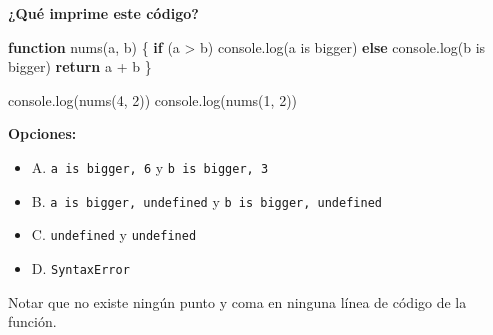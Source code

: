 \documentclass[
  letterpaper,
  DIV=11,
  numbers=noendperiod]{scrreprt}
\newenvironment{Shaded}{\begin{snugshade}}{\end{snugshade}}
\newcommand{\BuiltInTok}[1]{\textcolor[rgb]{0.00,0.23,0.31}{#1}}
\newcommand{\ControlFlowTok}[1]{\textcolor[rgb]{0.00,0.23,0.31}{\textbf{#1}}}
\newcommand{\DecValTok}[1]{\textcolor[rgb]{0.68,0.00,0.00}{#1}}
\newcommand{\FunctionTok}[1]{\textcolor[rgb]{0.28,0.35,0.67}{#1}}
\newcommand{\KeywordTok}[1]{\textcolor[rgb]{0.00,0.23,0.31}{\textbf{#1}}}
\newcommand{\NormalTok}[1]{\textcolor[rgb]{0.00,0.23,0.31}{#1}}
\newcommand{\OperatorTok}[1]{\textcolor[rgb]{0.37,0.37,0.37}{#1}}
\newcommand{\StringTok}[1]{\textcolor[rgb]{0.13,0.47,0.30}{#1}}
\providecommand{\tightlist}{%
  \setlength{\itemsep}{0pt}\setlength{\parskip}{0pt}}
\begin{document}
\textbf{¿Qué imprime este código?}

\begin{Shaded}
\begin{Highlighting}[]
\KeywordTok{function} \FunctionTok{nums}\NormalTok{(a}\OperatorTok{,}\NormalTok{ b) \{}
  \ControlFlowTok{if}
\NormalTok{  (a }\OperatorTok{\textgreater{}}\NormalTok{ b)}
  \BuiltInTok{console}\OperatorTok{.}\FunctionTok{log}\NormalTok{(}\StringTok{\textquotesingle{}a is bigger\textquotesingle{}}\NormalTok{)}
  \ControlFlowTok{else} 
  \BuiltInTok{console}\OperatorTok{.}\FunctionTok{log}\NormalTok{(}\StringTok{\textquotesingle{}b is bigger\textquotesingle{}}\NormalTok{)}
  \ControlFlowTok{return} 
\NormalTok{  a }\OperatorTok{+}\NormalTok{ b}
\NormalTok{\}}

\BuiltInTok{console}\OperatorTok{.}\FunctionTok{log}\NormalTok{(}\FunctionTok{nums}\NormalTok{(}\DecValTok{4}\OperatorTok{,} \DecValTok{2}\NormalTok{))}
\BuiltInTok{console}\OperatorTok{.}\FunctionTok{log}\NormalTok{(}\FunctionTok{nums}\NormalTok{(}\DecValTok{1}\OperatorTok{,} \DecValTok{2}\NormalTok{))}
\end{Highlighting}
\end{Shaded}

\textbf{Opciones:}

\begin{itemize}
\tightlist
\item
  A. \texttt{a\ is\ bigger,\ 6} y \texttt{b\ is\ bigger,\ 3}
\item
  B. \texttt{a\ is\ bigger,\ undefined} y
  \texttt{b\ is\ bigger,\ undefined}
\item
  C. \texttt{undefined} y \texttt{undefined}
\item
  D. \texttt{SyntaxError}
\end{itemize}

\begin{tcolorbox}[enhanced jigsaw, left=2mm, toprule=.15mm, leftrule=.75mm, breakable, colback=white, coltitle=black, bottomtitle=1mm, arc=.35mm, rightrule=.15mm, colframe=quarto-callout-tip-color-frame, opacitybacktitle=0.6, toptitle=1mm, opacityback=0, titlerule=0mm, title=\textcolor{quarto-callout-tip-color}{\faLightbulb}\hspace{0.5em}{Pista}, bottomrule=.15mm, colbacktitle=quarto-callout-tip-color!10!white]

Notar que no existe ningún punto y coma en ninguna línea de código de la
función.

\end{tcolorbox}
\end{document}

